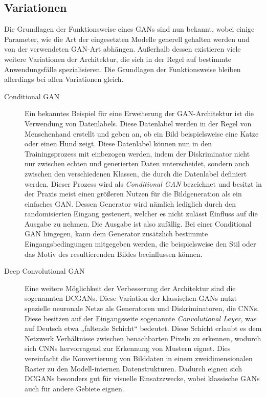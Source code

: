 \subsection{Variationen}

\noindent Die Grundlagen der Funktionsweise eines \acp{GAN} sind nun bekannt, wobei einige Parameter, wie die Art der eingesetzten Modelle generell gehalten werden und von der verwendeten GAN-Art abhängen. Außerhalb dessen existieren viele weitere Variationen der Architektur, die sich in der Regel auf bestimmte Anwendungsfälle spezialisieren. Die Grundlagen der Funktionsweise bleiben allerdings bei allen Variationen gleich. \\

\begin{description}
    \item[Conditional GAN] Ein bekanntes Beispiel für eine Erweiterung der \ac{GAN}-Architektur ist die Verwendung von Datenlabels. Diese Datenlabel werden in der Regel von Menschenhand erstellt und geben an, ob ein Bild beispielsweise eine Katze oder einen Hund zeigt. Diese Datenlabel können nun in den Trainingsprozess mit einbezogen werden, indem der Diskriminator nicht nur zwischen echten und generierten Daten unterscheidet, sondern auch zwischen den verschiedenen Klassen, die durch die Datenlabel definiert werden. Dieser Prozess wird als \textit{Conditional GAN} bezeichnet und besitzt in der Praxis meist einen größeren Nutzen für die Bildgeneration als ein einfaches \ac{GAN}. Dessen Generator wird nämlich lediglich durch den randomisierten Eingang gesteuert, welcher es nicht zulässt Einfluss auf die Ausgabe zu nehmen. Die Ausgabe ist also zufällig. Bei einer Conditional GAN hingegen, kann dem Generator zusätzlich bestimmte Eingangsbedingungen mitgegeben werden, die beispielsweise den Stil oder das Motiv des resultierenden Bildes beeinflussen können.

    \newpage

    \item[Deep Convolutional GAN] Eine weitere Möglichkeit der Verbesserung der Architektur sind die sogenannten \acp{DCGAN}. Diese Variation der klassischen \acp{GAN} nutzt spezielle neuronale Netze als Generatoren und Diskriminatoren, die \acp{CNN}. Diese besitzen auf der Eingangsseite sogenannte \textit{Convolutional Layer}, was auf Deutsch etwa „faltende Schicht“ bedeutet. Diese Schicht erlaubt es dem Netzwerk Verhältnisse zwischen benachbarten Pixeln zu erkennen, wodurch sich \acp{CNN} hervorragend zur Erkennung von Mustern eignet. Dies vereinfacht die Konvertierung von Bilddaten in einem zweidimensionalen Raster zu den Modell-internen Datenstrukturen. Dadurch eignen sich \acp{DCGAN} besonders gut für visuelle Einsatzzwecke, wobei klassische \acp{GAN} auch für andere Gebiete eignen. 


\end{description}

